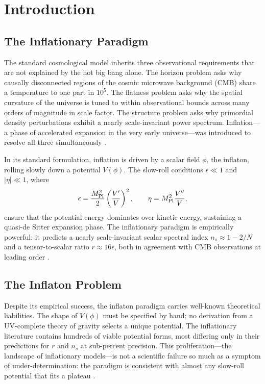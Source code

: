 \documentclass[12pt, a4paper]{article}
\begin{document}
\tableofcontents
\newpage

\section{Introduction}
\label{sec:intro}

\subsection{The Inflationary Paradigm}

The standard cosmological model inherits three observational requirements that are
not explained by the hot big bang alone. The horizon problem asks why causally
disconnected regions of the cosmic microwave background (CMB) share a temperature
to one part in $10^5$. The flatness problem asks why the spatial curvature of the
universe is tuned to within observational bounds across many orders of magnitude in
scale factor. The structure problem asks why primordial density perturbations exhibit
a nearly scale-invariant power spectrum. Inflation---a phase of accelerated expansion
in the very early universe---was introduced to resolve all three simultaneously
\citep{Guth1981, Linde1982, Albrecht1982}.

In its standard formulation, inflation is driven by a scalar field $\phi$, the
inflaton, rolling slowly down a potential $V(\phi)$. The slow-roll conditions
$\epsilon \ll 1$ and $|\eta| \ll 1$, where
\begin{equation}
\epsilon = \frac{M_{\rm Pl}^2}{2}\left(\frac{V'}{V}\right)^2, \qquad
\eta = M_{\rm Pl}^2 \frac{V''}{V},
\end{equation}
ensure that the potential energy dominates over kinetic energy, sustaining a
quasi-de Sitter expansion phase. The inflationary paradigm is empirically powerful:
it predicts a nearly scale-invariant scalar spectral index $n_s \approx 1 - 2/N$
and a tensor-to-scalar ratio $r \approx 16\epsilon$, both in agreement with CMB
observations at leading order \citep{Planck2020}.

\subsection{The Inflaton Problem}

Despite its empirical success, the inflaton paradigm carries well-known theoretical
liabilities. The shape of $V(\phi)$ must be specified by hand; no derivation from a
UV-complete theory of gravity selects a unique potential. The inflationary
literature contains hundreds of viable potential forms, most differing only in their
predictions for $r$ and $n_s$ at sub-percent precision. This proliferation---the
landscape of inflationary models---is not a scientific failure so much as a symptom
of under-determination: the paradigm is consistent with almost any slow-roll
potential that fits a plateau \citep{Martin2014}.
\end{document}
